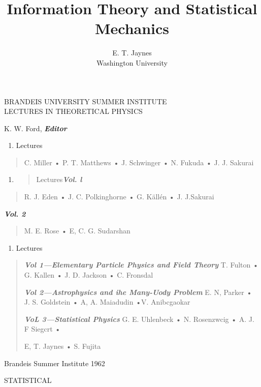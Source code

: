 \documentclass[]{article}
\title{Information Theory and Statistical Mechanics}
\author{E. T. Jaynes\\
Washington University}
\begin{document}
BRANDEIS UNIVERSITY SUMMER INSTITUTE\\
LECTURES IN THEORETICAL PHYSICS

K. W. Ford, \emph{\textbf{Editor}}

\begin{enumerate}
\def\labelenumi{\arabic{enumi}.}
\setcounter{enumi}{1959}
\item
  Lectures
\end{enumerate}

\begin{quote}
C. Miller • P. T. Matthews • J. Schwinger • N. Fukuda • J. J. Sakurai
\end{quote}

\begin{enumerate}
\def\labelenumi{\arabic{enumi}.}
\setcounter{enumi}{1960}
\item
  \begin{quote}
  Lectures\emph{\textbf{Vol. l}}
  \end{quote}
\end{enumerate}

\begin{quote}
R. J. Eden • J. C. Polkinghorne • G. Källén • J. J.Sakurai
\end{quote}

\emph{\textbf{Vol. 2}}

\begin{quote}
M. E. Rose • E, C. G. Sudarshan
\end{quote}

\begin{enumerate}
\def\labelenumi{\arabic{enumi}.}
\setcounter{enumi}{1961}
\item
  Lectures
\end{enumerate}

\begin{quote}
\emph{\textbf{Vol 1---Elementary Particle Physics and Field Theory}} T.
Fulton • G. Kallen • J. D. Jackson • C. Fronsdal

\emph{\textbf{Vol 2---Astrophysics and ihe Many-Uody Problem}} E. N,
Parker • J. S. Goldstein • A, A. Maiadudin •V. Anibcgaokar

\emph{\textbf{VoL 3---Statistical Physics}} G. E. Uhlenbeck • N.
Rosenzwcig • A. J. F Siegcrt •

E, T. Jaynes • S. Fujita
\end{quote}

Brandeis Summer Institute 1962

STATISTICAL
\end{document}
